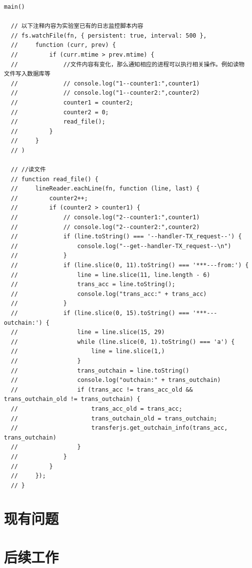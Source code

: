 \begin{lstlisting}[caption={修改后的监控日志脚本}]
  main()

  // 以下注释内容为实验室已有的日志监控脚本内容
  // fs.watchFile(fn, { persistent: true, interval: 500 },
  //     function (curr, prev) {
  //         if (curr.mtime > prev.mtime) {
  //             //文件内容有变化，那么通知相应的进程可以执行相关操作。例如读物文件写入数据库等
  //             // console.log("1--counter1:",counter1)
  //             // console.log("1--counter2:",counter2)
  //             counter1 = counter2;
  //             counter2 = 0;
  //             read_file();
  //         }
  //     }
  // )

  // //读文件
  // function read_file() {
  //     lineReader.eachLine(fn, function (line, last) {
  //         counter2++;
  //         if (counter2 > counter1) {
  //             // console.log("2--counter1:",counter1)
  //             // console.log("2--counter2:",counter2)
  //             if (line.toString() === '--handler-TX_request--') {
  //                 console.log("--get--handler-TX_request--\n")
  //             }
  //             if (line.slice(0, 11).toString() === '***---from:') {
  //                 line = line.slice(11, line.length - 6)
  //                 trans_acc = line.toString();
  //                 console.log("trans_acc:" + trans_acc)
  //             }
  //             if (line.slice(0, 15).toString() === '***---outchain:') {
  //                 line = line.slice(15, 29)
  //                 while (line.slice(0, 1).toString() === 'a') {
  //                     line = line.slice(1,)
  //                 }
  //                 trans_outchain = line.toString()
  //                 console.log("outchain:" + trans_outchain)
  //                 if (trans_acc != trans_acc_old && trans_outchain_old != trans_outchain) {
  //                     trans_acc_old = trans_acc;
  //                     trans_outchain_old = trans_outchain;
  //                     transferjs.get_outchain_info(trans_acc, trans_outchain)
  //                 }
  //             }
  //         }
  //     });
  // }

\end{lstlisting}

\chapter{现有问题}

\chapter{后续工作}


